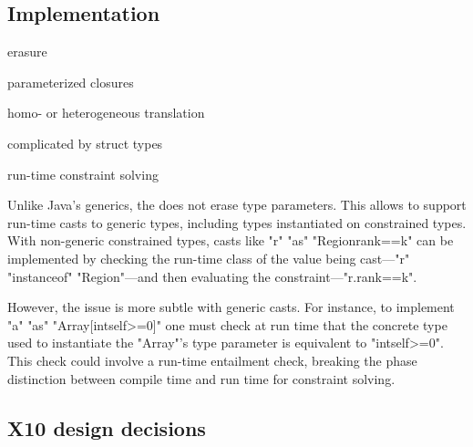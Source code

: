 \subsection{Implementation}

erasure

parameterized closures

homo- or heterogeneous translation

        complicated by struct types

run-time constraint solving

Unlike Java's generics, the \Xten does not erase type
parameters.  This allows \Xten to support run-time casts to 
generic types, including types instantiated on constrained
types.
With
non-generic constrained types, casts like \xcd"r" \xcd"as"
\xcd"Region{rank==k}" can be implemented by
checking the run-time class of the value being cast---\xcd"r" \xcd"instanceof" \xcd"Region"---and then
evaluating the constraint---\xcd"r.rank==k".

However, the issue is more subtle with generic casts.
For instance, to implement
\xcd"a" \xcd"as" \xcd"Array[int{self>=0}]"
one must check at run time that the concrete type used to instantiate
the \xcd"Array"'s type parameter is equivalent to
\xcd"int{self>=0}".  This check could involve a run-time
entailment check, 
breaking the phase distinction between
compile time and run time for constraint solving.

\subsection{X10 design decisions}


